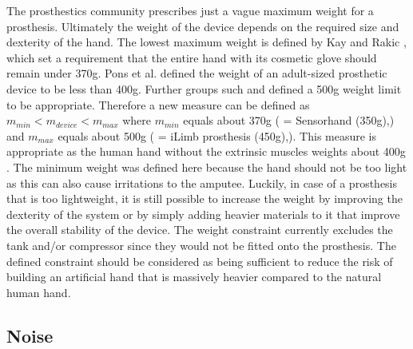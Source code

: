 \documentclass[main]{subfiles}
\begin{document}
The prosthestics community prescribes just a vague maximum weight for a prosthesis. Ultimately the weight of the device depends on the required size and dexterity of the hand. The lowest maximum weight is defined by Kay and Rakic \cite{Kay1972}, which set a requirement that the entire hand with its cosmetic glove should remain under 370g. Pons et al. \cite{Pons2004} defined the weight of an adult-sized prosthetic device to be less than 400g. Further groups such \cite{Light2000} and \cite{Vinet1995} defined a 500g weight limit to be appropriate. Therefore a new measure can be defined as $m_{min} < m_{device} < m_{max}$ where $m_{min}$ equals about 370g ( = Sensorhand (350g),\cite{Kay1972,Belter2011,Ottobock-Sensor1,Ottobock-Sensor2}) and $m_{max}$ equals about 500g ( = iLimb prosthesis (450g),\cite{Light2000,Vinet1995,Belter2011,RSLSteeperBebionic}). This measure is appropriate as the human hand without the extrinsic muscles weights about 400g \cite{Belter2011}. The minimum weight was defined here because the hand should not be too light as this can also cause irritations to the amputee. Luckily, in case of a prosthesis that is too lightweight, it is still possible to increase the weight by improving the dexterity of the system or by simply adding heavier materials to it that improve the overall stability of the device. The weight constraint currently excludes the tank and/or compressor since they would not be fitted onto the prosthesis. The defined constraint should be considered as being sufficient to reduce the risk of building an artificial hand that is massively heavier compared to the natural human hand.

\subsection{Noise}
\end{document}
